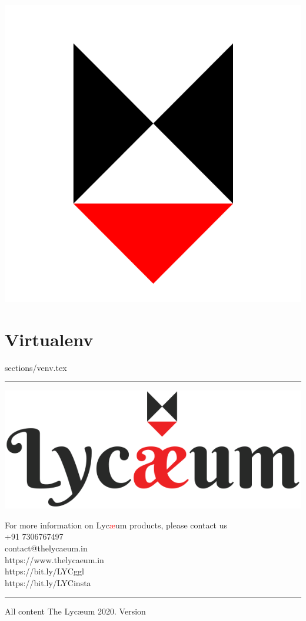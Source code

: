 \documentclass{../refsheet}
\begin{document}
\begin{center}
\includegraphics[scale=0.02]{../images/lycaeum-logo.png}
\end{center}
\section{Virtualenv}
 {sections/venv.tex}
\noindent\rule{\linewidth}{0.05ex}
\begin{center}
\includegraphics[scale=0.2]{../images/Lycaeum-logo-600.png}
\end{center}

For more information on Lyc\textcolor{red}{\ae{}}um products, please contact us  \\

\phone +91 7306767497  \\
\Email contact@thelycaeum.in \\
\faLink https://www.thelycaeum.in \\
\faGoogle https://bit.ly/LYCggl \\
\faInstagram https://bit.ly/LYCinsta

\textcolor{lightgray}{\noindent\rule{\linewidth}{0.05ex}}
\footnotesize All content \textcopyright The Lyc\ae{}um 2020. Version 
\end{document}
